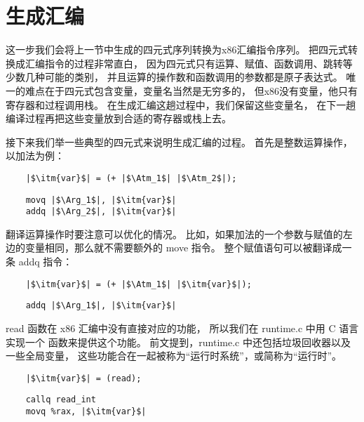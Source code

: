 
\section{生成汇编}

这一步我们会将上一节中生成的四元式序列转换为x86汇编指令序列。
把四元式转换成汇编指令的过程非常直白，
因为四元式只有运算、赋值、函数调用、跳转等少数几种可能的类别，
并且运算的操作数和函数调用的参数都是原子表达式。
唯一的难点在于四元式包含变量，变量名当然是无穷多的，
但x86没有变量，他只有寄存器和过程调用栈。
在生成汇编这趟过程中，我们保留这些变量名，
在下一趟编译过程再把这些变量放到合适的寄存器或栈上去。

接下来我们举一些典型的四元式来说明生成汇编的过程。
首先是整数运算操作，以加法为例：
\begin{transformation}
\begin{lstlisting}
    |$\itm{var}$| = (+ |$\Atm_1$| |$\Atm_2$|);
\end{lstlisting}
\compilesto
\begin{lstlisting}
    movq |$\Arg_1$|, |$\itm{var}$|
    addq |$\Arg_2$|, |$\itm{var}$|
\end{lstlisting}
\end{transformation}

翻译运算操作时要注意可以优化的情况。
比如，如果加法的一个参数与赋值的左边的变量相同，那么就不需要额外的 move 指令。
整个赋值语句可以被翻译成一条 addq 指令：
\begin{transformation}
\begin{lstlisting}
    |$\itm{var}$| = (+ |$\Atm_1$| |$\itm{var}$|);
\end{lstlisting}
\compilesto
\begin{lstlisting}
    addq |$\Arg_1$|, |$\itm{var}$|
\end{lstlisting}
\end{transformation}

read 函数在 x86 汇编中没有直接对应的功能，
所以我们在 runtime.c 中用 C 语言实现一个  函数来提供这个功能。
前文提到，runtime.c 中还包括垃圾回收器以及一些全局变量，
这些功能合在一起被称为“运行时系统”，或简称为“运行时”。
\begin{transformation}
\begin{lstlisting}
    |$\itm{var}$| = (read);
\end{lstlisting}
\compilesto
\begin{lstlisting}
    callq read_int
    movq %rax, |$\itm{var}$|
\end{lstlisting}
\end{transformation}

